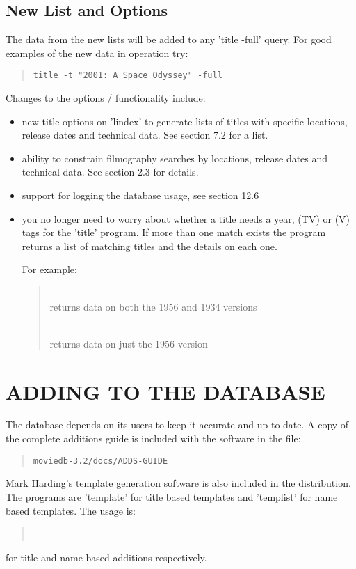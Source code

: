 \subsection{New List and Options}
The data from the new lists will be added to any 'title -full' query. For
good examples of the new data in operation try:
\begin{quote}
{\tt title -t "2001: A Space Odyssey" -full}
\end{quote}
Changes to the options / functionality include:
\begin{itemize}
\item new title options on 'lindex' to generate lists of titles with specific
   locations, release dates and technical data. See section 7.2 for a list.

\item ability to constrain filmography searches by locations, release dates and
   technical data. See section 2.3 for details.

\item support for logging the database usage, see section 12.6

\item you no longer need to worry about whether a title needs a year, (TV) or
   (V) tags for the 'title' program. If more than one match exists the 
   program returns a list of matching titles and the details on each one.   
   
For example:
\begin{quotation}
\\
returns data on both the 1956 and 1934 versions

\\
returns data on just the 1956 version 
\end{quotation}
\end{itemize}
\clearpage   
\section{ADDING TO THE DATABASE}
The database depends on its users to keep it accurate and up to date. A copy
of the complete additions guide is included with the software in the file:
\begin{quote}
{\tt moviedb-3.2/docs/ADDS-GUIDE}
\end{quote}
Mark Harding's template generation software is also included in the
distribution. The programs are 'template' for title based templates and 
'templist' for name based templates. The usage is:
\begin{quotation}
\\
\end{quotation}
for title and name based additions respectively.

